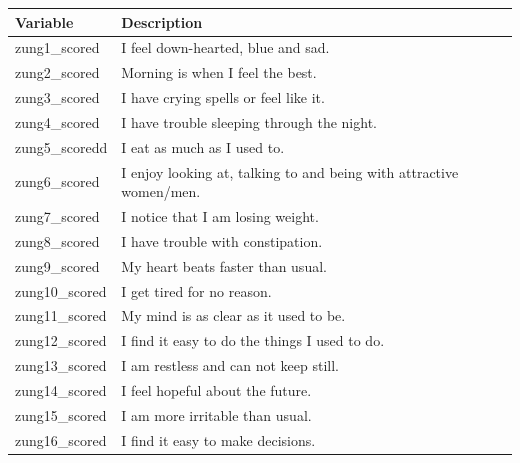 \documentclass[10pt,conference,a4paper]{IEEEtran}
\begin{document}
\begin{table}[H]
\begin{tabular}{@{}p{}p{}@{}}
\toprule
Variable                            & Description                                                         \\ \midrule
\multicolumn{1}{l|}{zung1\_scored}  & I feel down-hearted, blue and sad.                                  \\
\multicolumn{1}{l|}{zung2\_scored}  & Morning is when I feel the best.                                    \\
\multicolumn{1}{l|}{zung3\_scored}  & I have crying spells or feel like it.                               \\
\multicolumn{1}{l|}{zung4\_scored}  & I have trouble sleeping through the night.                          \\
\multicolumn{1}{l|}{zung5\_scoredd} & I eat as much as I used to.                                         \\
\multicolumn{1}{l|}{zung6\_scored}  & I enjoy looking at, talking to and being with attractive women/men. \\
\multicolumn{1}{l|}{zung7\_scored}  & I notice that I am losing weight.                                   \\
\multicolumn{1}{l|}{zung8\_scored}  & I have trouble with constipation.                                   \\
\multicolumn{1}{l|}{zung9\_scored}  & My heart beats faster than usual.                                   \\
\multicolumn{1}{l|}{zung10\_scored} & I get tired for no reason.                                          \\
\multicolumn{1}{l|}{zung11\_scored} & My mind is as clear as it used to be.                               \\
\multicolumn{1}{l|}{zung12\_scored} & I find it easy to do the things I used to do.                       \\
\multicolumn{1}{l|}{zung13\_scored} & I am restless and can not keep still.                               \\
\multicolumn{1}{l|}{zung14\_scored} & I feel hopeful about the future.                                    \\
\multicolumn{1}{l|}{zung15\_scored} & I am more irritable than usual.                                     \\
\multicolumn{1}{l|}{zung16\_scored} & I find it easy to make decisions.                                   \\

\end{tabular}
\end{table}
\end{document}
